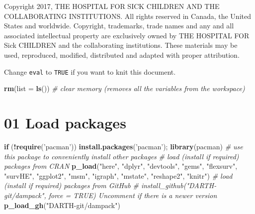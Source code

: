 \documentclass[
]{article}
\newenvironment{Shaded}{\begin{snugshade}}{\end{snugshade}}
\newcommand{\CommentTok}[1]{\textcolor[rgb]{0.56,0.35,0.01}{\textit{#1}}}
\newcommand{\ControlFlowTok}[1]{\textcolor[rgb]{0.13,0.29,0.53}{\textbf{#1}}}
\newcommand{\DataTypeTok}[1]{\textcolor[rgb]{0.13,0.29,0.53}{#1}}
\newcommand{\KeywordTok}[1]{\textcolor[rgb]{0.13,0.29,0.53}{\textbf{#1}}}
\newcommand{\NormalTok}[1]{#1}
\newcommand{\OperatorTok}[1]{\textcolor[rgb]{0.81,0.36,0.00}{\textbf{#1}}}
\newcommand{\StringTok}[1]{\textcolor[rgb]{0.31,0.60,0.02}{#1}}
\begin{document}
Copyright 2017, THE HOSPITAL FOR SICK CHILDREN AND THE COLLABORATING
INSTITUTIONS. All rights reserved in Canada, the United States and
worldwide. Copyright, trademarks, trade names and any and all associated
intellectual property are exclusively owned by THE HOSPITAL FOR Sick
CHILDREN and the collaborating institutions. These materials may be
used, reproduced, modified, distributed and adapted with proper
attribution.

\newpage

Change \texttt{eval} to \texttt{TRUE} if you want to knit this document.

\begin{Shaded}
\begin{Highlighting}[]
\KeywordTok{rm}\NormalTok{(}\DataTypeTok{list =} \KeywordTok{ls}\NormalTok{())      }\CommentTok{# clear memory (removes all the variables from the workspace)}
\end{Highlighting}
\end{Shaded}

\hypertarget{load-packages}{%
\section{01 Load packages}\label{load-packages}}

\begin{Shaded}
\begin{Highlighting}[]
\ControlFlowTok{if}\NormalTok{ (}\OperatorTok{!}\KeywordTok{require}\NormalTok{(}\StringTok{'pacman'}\NormalTok{)) }\KeywordTok{install.packages}\NormalTok{(}\StringTok{'pacman'}\NormalTok{); }\KeywordTok{library}\NormalTok{(pacman) }\CommentTok{# use this package to conveniently install other packages}
\CommentTok{# load (install if required) packages from CRAN}
\KeywordTok{p_load}\NormalTok{(}\StringTok{"here"}\NormalTok{, }\StringTok{"dplyr"}\NormalTok{, }\StringTok{"devtools"}\NormalTok{, }\StringTok{"gems"}\NormalTok{, }\StringTok{"flexsurv"}\NormalTok{, }\StringTok{"survHE"}\NormalTok{, }\StringTok{"ggplot2"}\NormalTok{, }\StringTok{"msm"}\NormalTok{, }\StringTok{"igraph"}\NormalTok{, }\StringTok{"mstate"}\NormalTok{,}
        \StringTok{"reshape2"}\NormalTok{, }\StringTok{"knitr"}\NormalTok{)  }
\CommentTok{# load (install if required) packages from GitHub}
\CommentTok{# install_github("DARTH-git/dampack", force = TRUE) Uncomment if there is a newer version}
\KeywordTok{p_load_gh}\NormalTok{(}\StringTok{"DARTH-git/dampack"}\NormalTok{)}
\end{Highlighting}
\end{Shaded}
\end{document}

